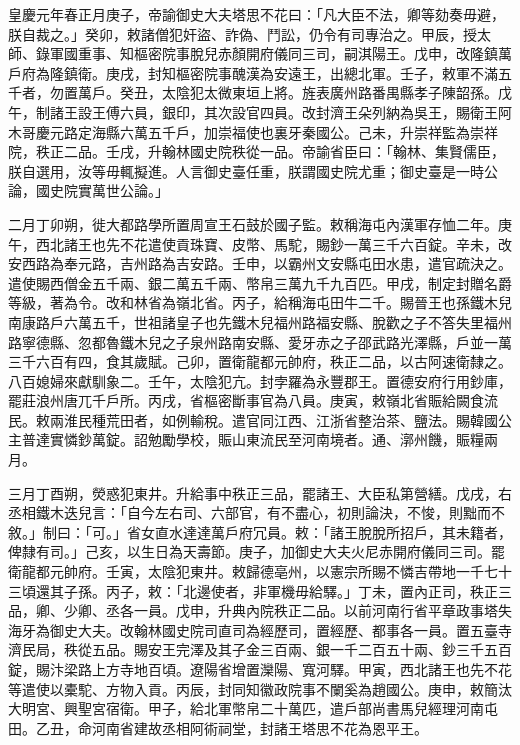 \begin{pinyinscope}
 皇慶元年春正月庚子，帝諭御史大夫塔思不花曰：「凡大臣不法，卿等劾奏毋避，朕自裁之。」癸卯，敕諸僧犯奸盜、詐偽、鬥訟，仍令有司專治之。甲辰，授太師、錄軍國重事、知樞密院事脫兒赤顏開府儀同三司，嗣淇陽王。戊申，改隆鎮萬戶府為隆鎮衛。庚戌，封知樞密院事醜漢為安遠王，出總北軍。壬子，敕軍不滿五千者，勿置萬戶。癸丑，太陰犯太微東垣上將。旌表廣州路番禺縣孝子陳韶孫。戊午，制諸王設王傅六員，銀印，其次設官四員。改封濟王朵列納為吳王，賜衛王阿木哥慶元路定海縣六萬五千戶，加崇福使也裏牙秦國公。己未，升崇祥監為崇祥院，秩正二品。壬戌，升翰林國史院秩從一品。帝諭省臣曰：「翰林、集賢儒臣，朕自選用，汝等毋輒擬進。人言御史臺任重，朕謂國史院尤重；御史臺是一時公論，國史院實萬世公論。」



 二月丁卯朔，徙大都路學所置周宣王石鼓於國子監。敕稱海屯內漢軍存恤二年。庚午，西北諸王也先不花遣使貢珠寶、皮幣、馬駝，賜鈔一萬三千六百錠。辛未，改安西路為奉元路，吉州路為吉安路。壬申，以霸州文安縣屯田水患，遣官疏決之。遣使賜西僧金五千兩、銀二萬五千兩、幣帛三萬九千九百匹。甲戌，制定封贈名爵等級，著為令。改和林省為嶺北省。丙子，給稱海屯田牛二千。賜晉王也孫鐵木兒南康路戶六萬五千，世祖諸皇子也先鐵木兒福州路福安縣、脫歡之子不答失里福州路寧德縣、忽都魯鐵木兒之子泉州路南安縣、愛牙赤之子邵武路光澤縣，戶並一萬三千六百有四，食其歲賦。己卯，置衛龍都元帥府，秩正二品，以古阿速衛隸之。八百媳婦來獻馴象二。壬午，太陰犯亢。封孛羅為永豐郡王。置德安府行用鈔庫，罷莊浪州唐兀千戶所。丙戌，省樞密斷事官為八員。庚寅，敕嶺北省賑給闕食流民。敕兩淮民種荒田者，如例輸稅。遣官同江西、江浙省整治茶、鹽法。賜韓國公主普達實憐鈔萬錠。詔勉勵學校，賑山東流民至河南境者。通、漷州饑，賑糧兩月。



 三月丁酉朔，熒惑犯東井。升給事中秩正三品，罷諸王、大臣私第營繕。戊戌，右丞相鐵木迭兒言：「自今左右司、六部官，有不盡心，初則論決，不悛，則黜而不敘。」制曰：「可。」省女直水達達萬戶府冗員。敕：「諸王脫脫所招戶，其未籍者，俾隸有司。」己亥，以生日為天壽節。庚子，加御史大夫火尼赤開府儀同三司。罷衛龍都元帥府。壬寅，太陰犯東井。敕歸德亳州，以憲宗所賜不憐吉帶地一千七十三頃還其子孫。丙子，敕：「北邊使者，非軍機毋給驛。」丁未，置內正司，秩正三品，卿、少卿、丞各一員。戊申，升典內院秩正二品。以前河南行省平章政事塔失海牙為御史大夫。改翰林國史院司直司為經歷司，置經歷、都事各一員。置五臺寺濟民局，秩從五品。賜安王完澤及其子金三百兩、銀一千二百五十兩、鈔三千五百錠，賜汴梁路上方寺地百頃。遼陽省增置灤陽、寬河驛。甲寅，西北諸王也先不花等遣使以橐駝、方物入貢。丙辰，封同知徽政院事不闌奚為趙國公。庚申，敕簡汰大明宮、興聖宮宿衛。甲子，給北軍幣帛二十萬匹，遣戶部尚書馬兒經理河南屯田。乙丑，命河南省建故丞相阿術祠堂，封諸王塔思不花為恩平王。




\end{pinyinscope}
